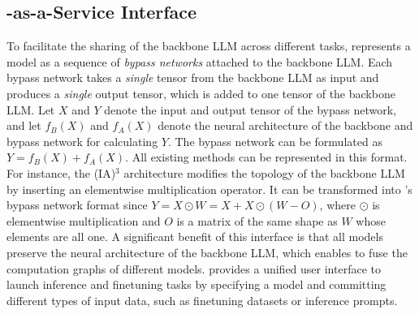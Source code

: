 \subsection{\peft-as-a-Service Interface}
\label{subsec:paas_apis}

To facilitate the sharing of the backbone LLM across different tasks, \sys represents a \peft model as a sequence of {\em bypass networks} attached to the backbone LLM.
%
Each bypass network takes a {\em single} tensor from the backbone LLM as input and produces a {\em single} output tensor, which is added to one tensor of the backbone LLM.
%
Let $X$ and $Y$ denote the input and output tensor of the bypass network, and let $f_B(X)$ and $f_A(X)$ denote the neural architecture of the backbone and bypass network for calculating $Y$. The bypass network can be formulated as $Y = f_B(X) + f_A(X)$.
%
All existing \peft methods can be represented in this format. For instance, the (IA)$^3$ architecture modifies the topology of the backbone LLM by inserting an elementwise multiplication operator. It can be transformed into \sys's bypass network format since $Y = X\odot W = X + X \odot (W - O)$, where $\odot$ is elementwise multiplication and $O$ is a matrix of the same shape as $W$ whose elements are all one.
%
A significant benefit of this interface is that all \peft models preserve the neural architecture of the backbone LLM, which enables \sys to fuse the computation graphs of different \peft models.
%
\sys provides a unified user interface to launch inference and finetuning tasks by specifying a \peft model and committing different types of input data, such as finetuning datasets or inference prompts.
